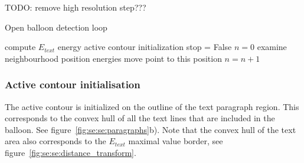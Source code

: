 TODO: remove high resolution step???

\begin{algorithm}
\caption{Open balloon detection loop}
\label{al:be:method}
\begin{algorithmic}
  \STATE compute $E_{text}$ energy
  \STATE active contour initialization
  \STATE stop = False
    \STATE $n = 0$
      \STATE examine neighbourhood position energies
		\STATE move point to this position
		\STATE $n=n+1$
      \ENDIF
    \ENDFOR
    \ENDIF
  \ENDWHILE%
\ENDFOR
\end{algorithmic}
\end{algorithm}

\subsubsection{Active contour initialisation}
\label{sec:se:cont_init}

The active contour is initialized on the outline of the text paragraph region.
This corresponds to the convex hull of all the text lines that are included in the balloon.
See figure~\ref{fig:se:se:paragraphs}b).
Note that the convex hull of the text area also corresponds to the $E_{text}$ maximal value border, see figure~\ref{fig:se:se:distance_transform}.




